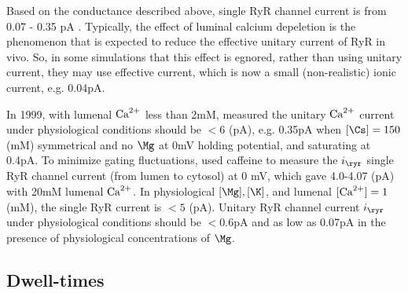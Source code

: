 Based on the conductance described above, single RyR channel current is from
0.07 - 0.35 pA \citep{mejia-alvarez1999, Kettlun2003, Guatimosim2002}.
Typically, the effect of luminal calcium depeletion is the phenomenon that is
expected to reduce the effective unitary current of RyR in vivo. So, in some
simulations that this effect is egnored, rather than using unitary current, they
may use effective current, which is now a small (non-realistic) ionic current,
e.g. 0.04pA\citep{groff2008}.

In 1999, with lumenal ${\text{Ca}^{2+}}$ less than 2mM, \citep{mejia-alvarez1999} measured
the unitary ${\text{Ca}^{2+}}$ current under physiological conditions should be $< 6$ (pA),
e.g. 0.35pA  when $[\Cs]=150$ (mM) symmetrical and no $\Mg$ at 0mV holding
potential, and saturating at 0.4pA.
To minimize gating fluctuations, \citep{Kettlun2003} used caffeine to measure
the $i_\ryr$ single RyR channel current (from lumen to cytosol) at 0 mV, which
gave 4.0-4.07 (pA) with 20mM lumenal ${\text{Ca}^{2+}}$. In physiological $[\Mg], [\K]$, and
lumenal $[{\text{Ca}^{2+}}]=1$ (mM), the single RyR current is $< 5$ (pA)\citep{Kettlun2003}.
Unitary RyR channel current $i_\ryr$ under physiological conditions
should be $< 0.6$pA and as low as 0.07pA in the presence of
physiological concentrations of $\Mg$. 



\subsection{Dwell-times}





